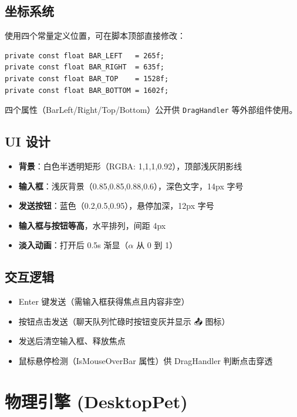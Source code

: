 \documentclass[12pt,a4paper]{ctexart}
\begin{document}
\subsection{坐标系统}

使用四个常量定义位置，可在脚本顶部直接修改：

\begin{lstlisting}[style=csharp,caption={BottomInputBar 坐标常量},label={lst:bar-coords}]
private const float BAR_LEFT   = 265f;
private const float BAR_RIGHT  = 635f;
private const float BAR_TOP    = 1528f;
private const float BAR_BOTTOM = 1602f;
\end{lstlisting}

四个属性（BarLeft/Right/Top/Bottom）公开供 \texttt{DragHandler}
等外部组件使用。

\subsection{UI 设计}

\begin{itemize}
    \item \textbf{背景}：白色半透明矩形（RGBA: 1,1,1,0.92），顶部浅灰阴影线
    \item \textbf{输入框}：浅灰背景（0.85,0.85,0.88,0.6），深色文字，14px 字号
    \item \textbf{发送按钮}：蓝色（0.2,0.5,0.95），悬停加深，12px 字号
    \item \textbf{输入框与按钮等高}，水平排列，间距 4px
    \item \textbf{淡入动画}：打开后 0.5s 渐显（$\alpha$ 从 0 到 1）
\end{itemize}

\subsection{交互逻辑}

\begin{itemize}
    \item Enter 键发送（需输入框获得焦点且内容非空）
    \item 按钮点击发送（聊天队列忙碌时按钮变灰并显示 📤 图标）
    \item 发送后清空输入框、释放焦点
    \item 鼠标悬停检测（IsMouseOverBar 属性）供 DragHandler 判断点击穿透
\end{itemize}

\section{物理引擎 (DesktopPet)}
\end{document}
